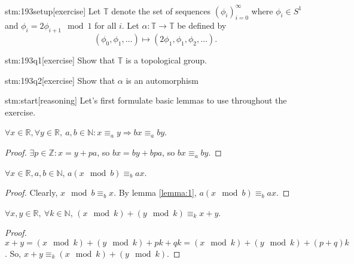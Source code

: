 
\begin{stm}{stm:193setup}[exercise]
Let $\mathbb{T}$ denote the set of sequences $(\phi_i)_{i=0}^{\infty}$ where $\phi_i \in S^1$ and $\phi_i = 2 \phi_{i+1} \mod 1$ for all $i$. Let $\alpha : \mathbb{T} \to \mathbb{T}$ be defined by 
\[
(\phi_0, \phi_1, \dots) \mapsto (2\phi_1, \phi_1, \phi_2, \dots).
\]
\end{stm}
\begin{stm}{stm:193q1}[exercise]
Show that $\mathbb{T}$ is a topological group.
\end{stm}

\begin{stm}{stm:193q2}[exercise]
Show that $\alpha$ is an automorphism
\end{stm}
    


\begin{stm}{stm:start}[reasoning]
Let's first formulate basic lemmas to use throughout the exercise.
\end{stm}

\begin{lemma}\label{lemma:1}
$\forall x \in \mathbb{R}, \forall y \in \mathbb{R}, \ a, b \in \mathbb{N} : x \equiv_a y \Rightarrow bx \equiv_{a} by$. 
\end{lemma}

\begin{proof}
$\exists p \in \mathbb{Z} : x = y + pa$, so $bx = by + bpa$, so $bx \equiv_{a} by$.
\end{proof}

\begin{lemma}\label{lemma:3}
$\forall x \in \mathbb{R}, a,b \in \mathbb{N}$, $a(x \mod b) \equiv_b ax$.
\end{lemma}

\begin{proof}
Clearly, $x \mod b \equiv_b x$. By lemma \ref{lemma:1}, $a(x \mod b) \equiv_b ax$.
\end{proof}

\begin{lemma}\label{lemma:4}
$\forall x, y \in \mathbb{R}, \ \forall k \in \mathbb{N}$, $( x \mod k ) + ( y \mod k ) \equiv_k x + y$.
\end{lemma}

\begin{proof}
$x + y = ( x \mod k ) + ( y \mod k ) + pk + qk = (x \mod k) + (y \mod k) + (p+q)k$. So, $x + y \equiv_k (x \mod k) + (y \mod k)$.
\end{proof}

